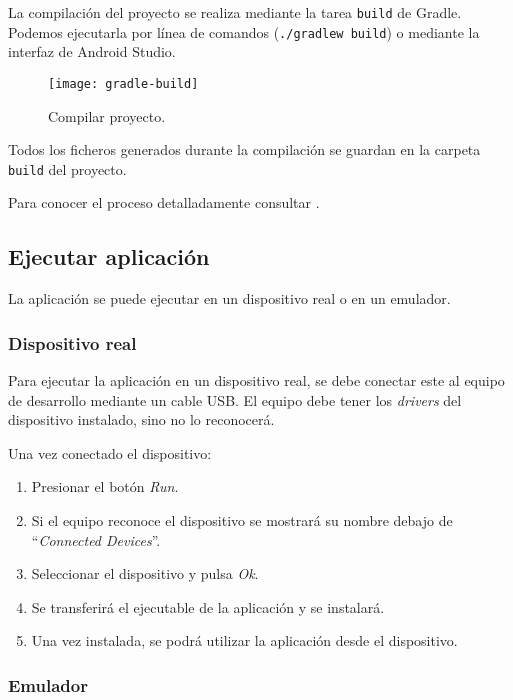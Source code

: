 La compilación del proyecto se realiza mediante la tarea \texttt{build}
de Gradle. Podemos ejecutarla por línea de comandos
(\texttt{./gradlew\ build}) o mediante la interfaz de Android Studio.

\begin{figure}[H]
	\centering
	\texttt{[image: gradle-build]}
	\caption{Compilar proyecto.}\label{fig:gradle-build}
\end{figure}

Todos los ficheros generados durante la compilación se guardan en la
carpeta \texttt{build} del proyecto.

Para conocer el proceso detalladamente consultar
\citep{android:compilerun}.

\subsection{Ejecutar aplicación}\label{ejecutar-aplicacion}

La aplicación se puede ejecutar en un dispositivo real o en un emulador.

\subsubsection{Dispositivo real}\label{dispositivo-real}

Para ejecutar la aplicación en un dispositivo real, se debe conectar
este al equipo de desarrollo mediante un cable USB. El equipo debe tener
los \emph{drivers} del dispositivo instalado, sino no lo reconocerá.

Una vez conectado el dispositivo:

\begin{enumerate}
\def\labelenumi{\arabic{enumi}.}
\tightlist
\item
  Presionar el botón \emph{Run}.
\item
  Si el equipo reconoce el dispositivo se mostrará su nombre debajo de
  ``\emph{Connected Devices}''.
\item
  Seleccionar el dispositivo y pulsa \emph{Ok}.
\item
  Se transferirá el ejecutable de la aplicación y se instalará.
\item
  Una vez instalada, se podrá utilizar la aplicación desde el
  dispositivo.
\end{enumerate}

\subsubsection{Emulador}\label{emulador}

